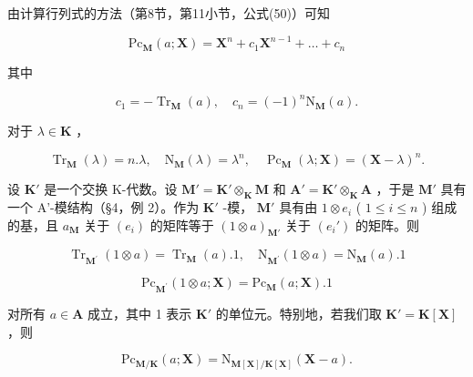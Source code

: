 由计算行列式的方法（第8节，第11小节，公式(50)）可知

\[
\mathrm{Pc} _ {\mathbf {M}} (a; \mathbf {X}) = \mathbf {X} ^ {n} + c _ {1} \mathbf {X} ^ {n - 1} + \dots + c _ {n}\tag{7}
\]

其中

\[
c _ {1} = - \operatorname{Tr} _ {\mathbf {M}} (a), \quad c _ {n} = (- 1) ^ {n} \mathrm{N} _ {\mathbf {M}} (a).\tag{8}
\]

对于 \(\lambda \in \mathbf{K}\) ，

\[
\operatorname{Tr} _ {\mathbf {M}} (\lambda) = n. \lambda , \quad \mathrm{N} _ {\mathbf {M}} (\lambda) = \lambda^ {n}, \quad \operatorname{Pc} _ {\mathbf {M}} (\lambda ; \mathbf {X}) = (\mathbf {X} - \lambda) ^ {n}.\tag{9}
\]

设 \(\mathbf{K}'\) 是一个交换 K-代数。设 \(\mathbf{M}' = \mathbf{K}' \otimes_{\mathbf{K}} \mathbf{M}\) 和 \(\mathbf{A}' = \mathbf{K}' \otimes_{\mathbf{K}} \mathbf{A}\) ，于是 \(\mathbf{M}'\) 具有一个 A'-模结构（§4，例 2）。作为 \(\mathbf{K}'\) -模， \(\mathbf{M}'\) 具有由 \(1 \otimes e_i\) ( \(1 \leqslant i \leqslant n\) ) 组成的基，且 \(a_{\mathbf{M}}\) 关于 \((e_i)\) 的矩阵等于 \((1 \otimes a)_{\mathbf{M}'}\) 关于 \((e_i')\) 的矩阵。则

\[
\operatorname{Tr} _ {\mathbf {M} ^ {\prime}} (1 \otimes a) = \operatorname{Tr} _ {\mathbf {M}} (a). 1, \quad \mathrm{N} _ {\mathbf {M} ^ {\prime}} (1 \otimes a) = \mathrm{N} _ {\mathbf {M}} (a). 1\tag{12}
\]

\[
\mathrm{Pc} _ {\mathbf {M} ^ {\prime}} (1 \otimes a; \mathbf {X}) = \mathrm{Pc} _ {\mathbf {M}} (a; \mathbf {X}). 1
\]

对所有 \(a \in \mathbf{A}\) 成立，其中 1 表示 \(\mathbf{K}'\) 的单位元。特别地，若我们取 \(\mathbf{K}' = \mathbf{K}[\mathbf{X}]\) ，则

\[
\mathrm{Pc} _ {\mathbf {M} / \mathbf {K}} (a; \mathbf {X}) = \mathrm{N} _ {\mathbf {M} [ \mathbf {X} ] / \mathbf {K} [ \mathbf {X} ]} (\mathbf {X} - a).\tag{13}
\]

